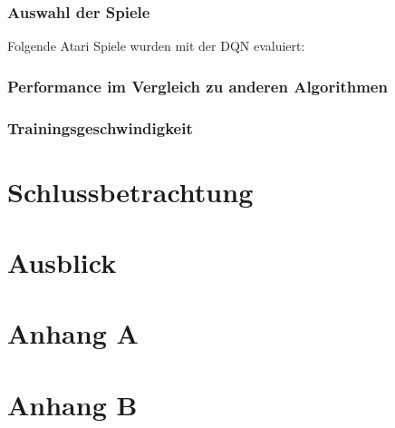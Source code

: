 \documentclass[a4paper,titlepage]{article}
\numberwithin{equation}{section} %
\begin{document}
{\subsubsection{Auswahl der Spiele}
Folgende Atari Spiele wurden mit der DQN evaluiert:
\subsubsection{Performance im Vergleich zu anderen Algorithmen}

\subsubsection{Trainingsgeschwindigkeit}

\newpage



\section{Schlussbetrachtung}
\newpage


\section{Ausblick}
\newpage



\begingroup
{}
\renewcommand*\refname{Literaturverzeichnis}
\printbibliography

\endgroup

\newpage
\section*{Anhang A}
\setcounter{page}{1}



\newpage


\section*{Anhang B}

\newpage

\end{document}
